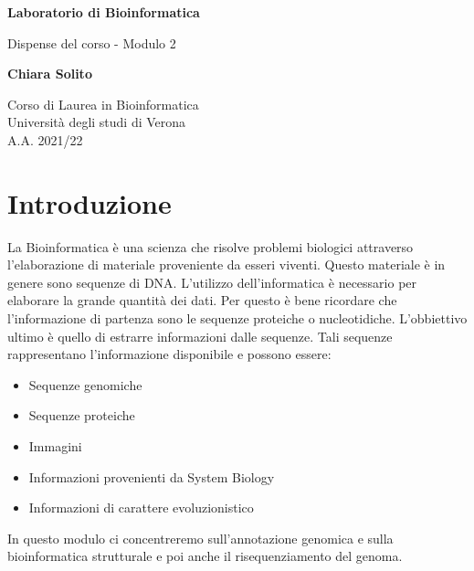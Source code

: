 \documentclass{article}
\begin{document}
\newcommand\tab[1][0.3cm]{\hspace*{#1}}


\begin{titlepage}
    \begin{center}
        \vspace*{1cm}
            
        \Huge
        \textbf{Laboratorio di Bioinformatica}
            
        \vspace{0.5cm}
        \LARGE
        Dispense del corso - Modulo 2
            
        \vspace{1.5cm}
            
        \textbf{Chiara Solito}

        \vspace{0.8cm}

            
        \Large
        Corso di Laurea in Bioinformatica\\
        Università degli studi di Verona\\
        A.A. 2021/22
            
    \end{center}
\end{titlepage}
\section{Introduzione}
La Bioinformatica è una scienza che risolve problemi biologici attraverso l’elaborazione di materiale proveniente da esseri viventi. Questo materiale è in genere sono sequenze di DNA. L’utilizzo dell’informatica è necessario per elaborare la grande quantità dei dati.
Per questo è bene ricordare che l’informazione di partenza sono le sequenze proteiche o nucleotidiche. L’obbiettivo ultimo è quello di estrarre informazioni dalle sequenze. Tali sequenze rappresentano l’informazione disponibile e possono essere:
\begin{itemize}
    \item Sequenze genomiche
    \item Sequenze proteiche
    \item Immagini
    \item Informazioni provenienti da System Biology
    \item Informazioni di carattere evoluzionistico
\end{itemize}
In questo modulo ci concentreremo sull’annotazione genomica e sulla bioinformatica strutturale e poi anche il risequenziamento del genoma.
\end{document}
